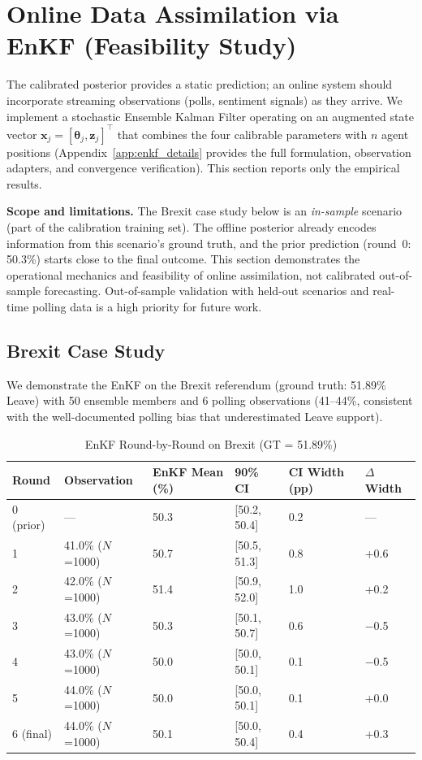 \documentclass[12pt]{article}
\begin{document}
\section{Online Data Assimilation via EnKF (Feasibility Study)}
\label{sec:enkf}

The calibrated posterior provides a static prediction; an online system should incorporate streaming observations (polls, sentiment signals) as they arrive. We implement a stochastic Ensemble Kalman Filter \citep{evensen2003} operating on an augmented state vector $\mathbf{x}_j = [\boldsymbol{\theta}_j, \mathbf{z}_j]^\top$ that combines the four calibrable parameters with $n$ agent positions (Appendix~\ref{app:enkf_details} provides the full formulation, observation adapters, and convergence verification). This section reports only the empirical results.

\textbf{Scope and limitations.} The Brexit case study below is an \emph{in-sample} scenario (part of the calibration training set). The offline posterior already encodes information from this scenario's ground truth, and the prior prediction (round~0: 50.3\%) starts close to the final outcome. This section demonstrates the operational mechanics and feasibility of online assimilation, not calibrated out-of-sample forecasting. Out-of-sample validation with held-out scenarios and real-time polling data is a high priority for future work.

\subsection{Brexit Case Study}

We demonstrate the EnKF on the Brexit referendum (ground truth: 51.89\% Leave) with 50 ensemble members and 6 polling observations (41--44\%, consistent with the well-documented polling bias that underestimated Leave support).

\begin{table}[H]
\centering
\caption{EnKF Round-by-Round on Brexit (GT = 51.89\%)}
\label{tab:enkf_rounds}
\begin{tabular}{llllll}
\toprule
Round & Observation & EnKF Mean (\%) & 90\% CI & CI Width (pp) & $\Delta$ Width \\
\midrule
0 (prior) & --- & 50.3 & [50.2, 50.4] & 0.2 & --- \\
1 & 41.0\% ($N$=1000) & 50.7 & [50.5, 51.3] & 0.8 & +0.6 \\
2 & 42.0\% ($N$=1000) & 51.4 & [50.9, 52.0] & 1.0 & +0.2 \\
3 & 43.0\% ($N$=1000) & 50.3 & [50.1, 50.7] & 0.6 & $-$0.5 \\
4 & 43.0\% ($N$=1000) & 50.0 & [50.0, 50.1] & 0.1 & $-$0.5 \\
5 & 44.0\% ($N$=1000) & 50.0 & [50.0, 50.1] & 0.1 & +0.0 \\
6 (final) & 44.0\% ($N$=1000) & 50.1 & [50.0, 50.4] & 0.4 & +0.3 \\
\bottomrule
\end{tabular}
\end{table}
\end{document}
